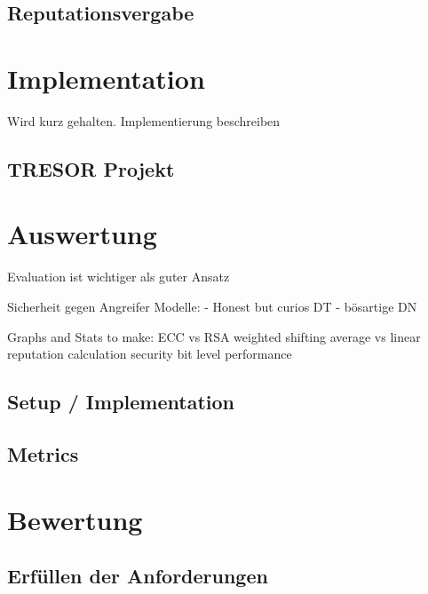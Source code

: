 \documentclass[11pt,a4paper]{scrreprt}
\begin{document}
\section{Reputationsvergabe}




\chapter{Implementation}
Wird kurz gehalten. Implementierung beschreiben

\section{TRESOR Projekt}


\chapter{Auswertung}
Evaluation ist wichtiger als guter Ansatz

Sicherheit gegen Angreifer Modelle:
    - Honest but curios DT
    - bösartige DN



Graphs and Stats to make:
ECC vs RSA
weighted shifting average vs linear reputation calculation
security bit level performance

\section{Setup / Implementation}

\section{Metrics}



\chapter{Bewertung}

\section{Erfüllen der Anforderungen}
\end{document}
